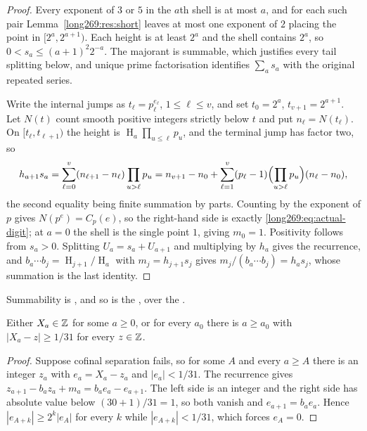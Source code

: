 \documentclass[11pt]{article}
\newcommand{\hgt}{\operatorname{H}}
\begin{document}
\begin{proof}
Every exponent of $3$ or $5$ in the $a$th shell is at most $a$, and for each
such pair Lemma~\ref{long269:res:short} leaves at most one exponent of $2$ placing the
point in $[2^{a},2^{a+1})$.  Each height is at least $2^{a}$ and the shell
contains $2^{a}$, so $0<s_a\le(a+1)^{2}2^{-a}$.  The majorant is summable,
which justifies every tail splitting below, and unique prime factorisation
identifies $\sum_a s_a$ with the original repeated series.

Write the internal jumps as $t_\ell=p_\ell^{e_\ell}$, $1\le\ell\le v$, and set
$t_0=2^{a}$, $t_{v+1}=2^{a+1}$.  Let $N(t)$ count smooth positive integers
strictly below $t$ and put $n_\ell=N(t_\ell)$.  On $[t_\ell,t_{\ell+1})$ the
height is $\hgt_a\prod_{u\le\ell}p_u$, and the terminal jump has factor two, so
\[
 h_{a+1}s_a
 =\sum_{\ell=0}^{v}(n_{\ell+1}-n_\ell)\prod_{u>\ell}p_u
 =n_{v+1}-n_0+\sum_{\ell=1}^{v}(p_\ell-1)
        \Bigl(\prod_{u>\ell}p_u\Bigr)(n_\ell-n_0),
\]
the second equality being finite summation by parts.  Counting by the exponent
of $p$ gives $N(p^{e})=C_p(e)$, so the right-hand side is exactly
\eqref{long269:eq:actual-digit}; at $a=0$ the shell is the single point $1$, giving
$m_0=1$.  Positivity follows from $s_a>0$.  Splitting $U_a=s_a+U_{a+1}$ and
multiplying by $h_a$ gives the recurrence, and
$b_a\cdots b_j=\hgt_{j+1}/\hgt_a$ with $m_j=h_{j+1}s_j$ gives
$m_j/(b_a\cdots b_j)=h_as_j$, whose summation is the last identity.
\end{proof}

\noindent Summability is
,
and so is the
, over the
.

\begin{proposition}\label{long269:res:actual-dichotomy}
Either $X_a\in\mathbb{Z}$ for some $a\ge0$, or for every $a_0$ there is $a\ge a_0$ with
$|X_a-z|\ge1/31$ for every $z\in\mathbb{Z}$.
\end{proposition}

\begin{proof}
Suppose cofinal separation fails, so for some $A$ and every $a\ge A$ there is
an integer $z_a$ with $e_a=X_a-z_a$ and $|e_a|<1/31$.  The recurrence gives
$z_{a+1}-b_az_a+m_a=b_ae_a-e_{a+1}$.  The left side is an integer and the right
side has absolute value below $(30+1)/31=1$, so both vanish and
$e_{a+1}=b_ae_a$.  Hence $|e_{A+k}|\ge2^{k}|e_A|$ for every $k$ while
$|e_{A+k}|<1/31$, which forces $e_A=0$.
\end{proof}
\end{document}
